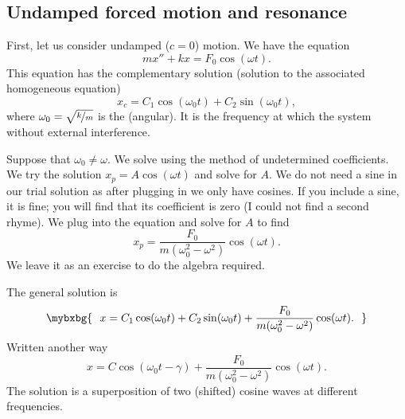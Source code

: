 \subsection{Undamped forced motion and resonance}

First, let us consider undamped ($c=0$) motion.
We have the equation
\begin{equation*}
mx'' + kx = F_0 \cos (\omega t) .
\end{equation*}
This equation has the complementary solution (solution to the associated homogeneous
equation)
\begin{equation*}
x_c = C_1 \cos (\omega_0 t) + C_2 \sin (\omega_0 t) ,
\end{equation*}
where $\omega_0 = \sqrt{\nicefrac{k}{m}}$ is the
\emph{} (angular).  It is the frequency
at which the system  without external interference.

Suppose that $\omega_0 \not= \omega$.
We solve using the method of undetermined coefficients.
We try the solution
$x_p = A \cos (\omega t)$ and solve for $A$.  We do not need a sine
in our trial solution as after plugging in we only have cosines.
If you include a sine, it is fine; you will find that its
coefficient is zero (I could not find a second rhyme).
We plug into the equation and solve for $A$ to find
\begin{equation*}
x_p = \frac{F_0}{m(\omega_0^2 - \omega^2)} \cos (\omega t) .
\end{equation*}
We leave it as an exercise to do the algebra required.

The general solution is
\begin{equation*}
\mybxbg{
~~
x = C_1 \cos (\omega_0 t) + C_2 \sin (\omega_0 t) +
\frac{F_0}{m(\omega_0^2 - \omega^2)} \cos (\omega t) .
~~
}
\end{equation*}
Written another way
\begin{equation*}
x = C \cos (\omega_0 t - \gamma) +
\frac{F_0}{m(\omega_0^2 - \omega^2)} \cos (\omega t) .
\end{equation*}
The solution is a superposition of two (shifted) cosine waves at different frequencies.
\pagebreak[2]

